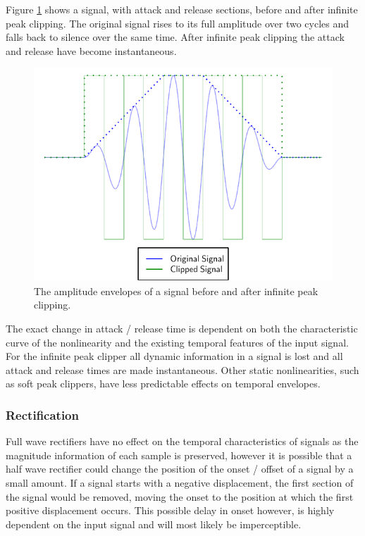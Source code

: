 			Figure \ref{fig:InfinitePeakClipping} shows a signal, with attack and release sections, before and
			after infinite peak clipping. The original signal rises to its full amplitude over two cycles and
			falls back to silence over the same time. After infinite peak clipping the attack and release have
			become instantaneous.

			\begin{figure}[h!]
				\centering
				\includegraphics{chapter5/Images/InfinitePeakClipping.pdf}
				\caption{The amplitude envelopes of a signal before and after infinite peak clipping.}
				\label{fig:InfinitePeakClipping}
			\end{figure}

			The exact change in attack / release time is dependent on both the characteristic curve of the
			nonlinearity and the existing temporal features of the input signal. For the infinite peak clipper
			all dynamic information in a signal is lost and all attack and release times are made
			instantaneous.  Other static nonlinearities, such as soft peak clippers, have less predictable
			effects on temporal envelopes. 

		\subsubsection*{Rectification}
			Full wave rectifiers have no effect on the temporal characteristics of signals as the magnitude
			information of each sample is preserved, however it is possible that a half wave rectifier could
			change the position of the onset / offset of a signal by a small amount. If a signal starts with a
			negative displacement, the first section of the signal would be removed, moving the onset to the
			position at which the first positive displacement occurs. This possible delay in onset however, is
			highly dependent on the input signal and will most likely be imperceptible.
			
